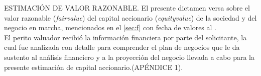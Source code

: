 \begin{rightcolumn}
\textcolor{secundario}{ESTIMACI\'ON DE VALOR RAZONABLE.} El presente dictamen versa sobre el valor razonable (\textit{\gls{fairvalue}}) del capital accionario (\textit{\gls{equityvalue}}) de la sociedad \empresaSolicitante y del negocio en marcha, mencionados en el \autoref{sec:f} con fecha de valores al \fechaValores.\\[10pt]

El perito valuador recibi\'o la informaci\'on financiera por parte del solicitante, la cual fue analizada con detalle para comprender el plan de negocios que le da sustento al an\'alisis financiero y a la proyecci\'on del negocio llevada a cabo para la presente estimaci\'on de capital accionario.(\textcolor{secundario}{AP\'ENDICE 1}).\\

\end{rightcolumn}